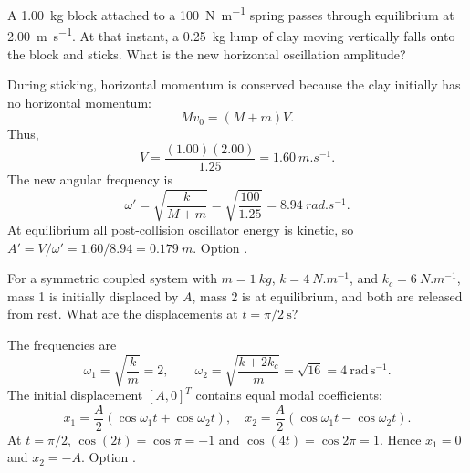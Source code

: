 \begin{quizquestion}[
  id=phy104-osc-045,
  topic=oscillations,
  difficulty=challenge,
  marks=3,
  correct=E,
  tags={inelastic-collision,shm,amplitude},
  outcome={Determine post-collision oscillation amplitude}
]
  A \SI{1.00}{kg} block attached to a \SI{100}{N.m^{-1}} spring passes through equilibrium at \SI{2.00}{m.s^{-1}}. At that instant, a \SI{0.25}{kg} lump of clay moving vertically falls onto the block and sticks. What is the new horizontal oscillation amplitude?
\end{quizquestion}
\begin{quizsolution}
  During sticking, horizontal momentum is conserved because the clay initially has no horizontal momentum:
    \[
      Mv_0=(M+m)V.
    \]
    Thus,
    \[
      V=\frac{(1.00)(2.00)}{1.25}=\SI{1.60}{m.s^{-1}}.
    \]
    The new angular frequency is
    \[
      \omega'=\sqrt{\frac{k}{M+m}}=\sqrt{\frac{100}{1.25}}=\SI{8.94}{rad.s^{-1}}.
    \]
    At equilibrium all post-collision oscillator energy is kinetic, so \(A'=V/\omega'=1.60/8.94=\SI{0.179}{m}\). Option \textbf{\quizcorrectletter}.
\end{quizsolution}

\begin{quizquestion}[
  id=phy104-nm-046,
  topic=normal-modes,
  difficulty=challenge,
  marks=3,
  correct=C,
  tags={coupled-oscillators,modal-superposition,time-evolution},
  outcome={Use modal superposition to determine coupled-system motion}
]
  For a symmetric coupled system with \(m=\SI{1}{kg}\), \(k=\SI{4}{N.m^{-1}}\), and \(k_c=\SI{6}{N.m^{-1}}\), mass 1 is initially displaced by \(A\), mass 2 is at equilibrium, and both are released from rest. What are the displacements at \(t=\pi/2\ \mathrm{s}\)?
\end{quizquestion}
\begin{quizsolution}
  The frequencies are
    \[
      \omega_1=\sqrt{\frac{k}{m}}=2,
      \qquad
      \omega_2=\sqrt{\frac{k+2k_c}{m}}=\sqrt{16}=4\ \mathrm{rad\,s^{-1}}.
    \]
    The initial displacement \({[A,0]}^T\) contains equal modal coefficients:
    \[
      x_1=\frac{A}{2}(\cos\omega_1t+\cos\omega_2t),
      \quad
      x_2=\frac{A}{2}(\cos\omega_1t-\cos\omega_2t).
    \]
    At \(t=\pi/2\), \(\cos(2t)=\cos\pi=-1\) and \(\cos(4t)=\cos2\pi=1\). Hence \(x_1=0\) and \(x_2=-A\). Option \textbf{\quizcorrectletter}.
\end{quizsolution}

